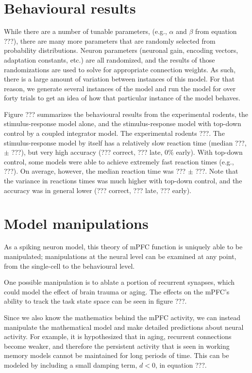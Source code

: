 \documentclass[12pt]{article}
\begin{document}
\section{Behavioural results}

While there are a number of tunable parameters,
(e.g., $\alpha$ and $\beta$ from equation ???),
there are many more parameters that are randomly selected
from probability distributions.
Neuron parameters (neuronal gain, encoding vectors,
adaptation constants, etc.) are all randomized,
and the results of those randomizations are used
to solve for appropriate connection weights.
As such, there is a large amount of variation
between instances of this model.
For that reason,
we generate several instances of the model
and run the model for over forty trials
to get an idea of how
that particular instance of the model behaves.

Figure ??? summarizes the behavioural results
from the experimental rodents, the stimulus-response model
alone, and the stimulus-response model with top-down
control by a coupled integrator model.
The experimental rodents ???.
The stimulus-response model by itself has a relatively slow
reaction time (median ???, $\pm$ ???),
but very high accuracy (??? correct, ??? late, 0\% early).
With top-down control, some models were able to achieve
extremely fast reaction times (e.g., ???).
On average, however, the median reaction time was
??? $\pm$ ???. Note that the variance in reactions times
was much higher with top-down control,
and the accuracy was in general lower (??? correct, ??? late,
??? early).

\section{Model manipulations}

As a spiking neuron model,
this theory of mPFC function is uniquely able to be
manipulated; manipulations at the neural level
can be examined at any point, from the single-cell
to the behavioural level.

One possible manipulation is to
ablate a portion of recurrent synapses,
which could model the effect of brain trauma or aging.
The effects on the mPFC's ability to track the
task state space can be seen in figure ???.

Since we also know the mathematics behind the mPFC activity,
we can instead manipulate the mathematical model
and make detailed predictions about neural activity.
For example, it is hypothesized that in aging,
recurrent connections become weaker, and therefore
the persistent activity that is seen in working memory models
cannot be maintained for long periods of time.
This can be modeled by including a small damping term, $d < 0$,
in equation ???.
\end{document}
